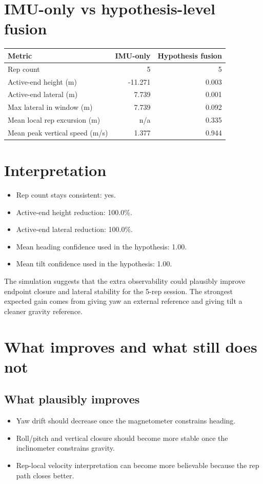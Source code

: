 \documentclass[11pt,a4paper]{article}
\begin{document}
\section{IMU-only vs hypothesis-level fusion}
\begin{tabular}{p{6cm}rr}
\toprule
Metric & IMU-only & Hypothesis fusion \\
\midrule
Rep count & 5 & 5 \\
Active-end height (m) & -11.271 & 0.003 \\
Active-end lateral (m) & 7.739 & 0.001 \\
Max lateral in window (m) & 7.739 & 0.092 \\
Mean local rep excursion (m) & n/a & 0.335 \\
Mean peak vertical speed (m/s) & 1.377 & 0.944 \\
\bottomrule
\end{tabular}
\section{Interpretation}
\begin{itemize}[leftmargin=1.4em]
\item Rep count stays consistent: yes.
\item Active-end height reduction: 100.0\%.
\item Active-end lateral reduction: 100.0\%.
\item Mean heading confidence used in the hypothesis: 1.00.
\item Mean tilt confidence used in the hypothesis: 1.00.
\end{itemize}
The simulation suggests that the extra observability could plausibly improve endpoint closure and lateral stability for the 5-rep session. The strongest expected gain comes from giving yaw an external reference and giving tilt a cleaner gravity reference.
\section{What improves and what still does not}
\subsection*{What plausibly improves}
\begin{itemize}[leftmargin=1.4em]
\item Yaw drift should decrease once the magnetometer constrains heading.
\item Roll/pitch and vertical closure should become more stable once the inclinometer constrains gravity.
\item Rep-local velocity interpretation can become more believable because the rep path closes better.
\end{itemize}
\end{document}
